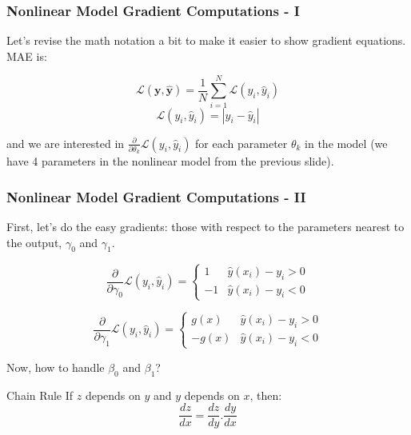 \documentclass{beamer}
\begin{document}
\begin{frame}
\frametitle{Nonlinear Model Gradient Computations - I}

Let's revise the math notation a bit to make it easier to show gradient equations. MAE is:

\[
\mathcal{L}(\mathbf{y},\hat{\mathbf{y}})=\frac{1}{N}\sum_{i=1}^{N}\mathcal{L}(y_{i},\hat{y}_{i})
\]
\[
\mathcal{L}(y_{i},\hat{y}_{i})=\left|y_{i}-\hat{y}_{i}\right|
\]

\hfill 

and we are interested in $\frac{\partial}{\partial\theta_{k}}\mathcal{L}(y_{i},\hat{y}_{i})$ for each parameter $\theta_k$ in the model (we have 4 parameters in the nonlinear model from the previous slide).

\end{frame}

\begin{frame}
\frametitle{Nonlinear Model Gradient Computations - II}

First, let's do the easy gradients: those with respect to the parameters nearest to the output, $\gamma_0$ and $\gamma_1$.

\[
\frac{\partial}{\partial\gamma_{0}}\mathcal{L}(y_{i},\hat{y}_{i})=\begin{cases}
1 & \hat{y}(x_{i})-y_{i}>0\\
-1 & \hat{y}(x_{i})-y_{i}<0
\end{cases}
\]

\[
\frac{\partial}{\partial\gamma_{1}}\mathcal{L}(y_{i},\hat{y}_{i})=\begin{cases}
g(x) & \hat{y}(x_{i})-y_{i}>0\\
-g(x) & \hat{y}(x_{i})-y_{i}<0
\end{cases}
\]

Now, how to handle $\beta_0$ and $\beta_1$?

\begin{block}{Chain Rule}
If $z$ depends on $y$ and $y$ depends on $x$, then:
\[
\frac{dz}{dx}=\frac{dz}{dy}.\frac{dy}{dx}
\]
\end{block}

\end{frame}
\end{document}
